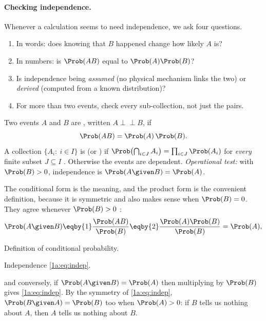 \paragraph{Checking independence.}
Whenever a calculation seems to need independence, we ask four questions.
\begin{enumerate}[leftmargin=1.5em,itemsep=1pt]
  \item In words: does knowing that $B$ happened change how likely $A$ is?
  \item In numbers: is $\Prob(AB)$ equal to $\Prob(A)\Prob(B)$?
  \item Is independence being \emph{assumed} (no physical mechanism links the
        two) or \emph{derived} (computed from a known distribution)?
  \item For more than two events, check every sub-collection, not just the pairs.
\end{enumerate}

\begin{workdef}[independence]
Two events $A$ and $B$ are , written $A\perp\!\!\!\perp B$, if
\begin{equation}
\Prob(AB)=\Prob(A)\,\Prob(B).
\label{1a:eq:indep}
\end{equation}
A collection $\{A_i:\ i\in I\}$ is  (or ) if
$\Prob\bigl(\bigcap_{i\in J}A_i\bigr)=\prod_{i\in J}\Prob(A_i)$ for \emph{every} finite
subset $J\subseteq I$ . Otherwise the events are dependent.
\emph{Operational test:} with $\Prob(B)>0$, independence is $\Prob(A\given B)=\Prob(A)$.
\end{workdef}

The conditional form is the meaning, and the product form is the convenient
definition, because it is symmetric and also makes sense when $\Prob(B)=0$. They
agree whenever $\Prob(B)>0$ :
\begin{align*}
\Prob(A\given B)\eqby{1}\frac{\Prob(AB)}{\Prob(B)}\eqby{2}\frac{\Prob(A)\Prob(B)}{\Prob(B)}=\Prob(A),
\end{align*}
\begin{explain}
  \item Definition of conditional probability.
  \item Independence \eqref{1a:eq:indep}.
\end{explain}
and conversely, if $\Prob(A\given B)=\Prob(A)$ then multiplying by $\Prob(B)$ gives
\eqref{1a:eq:indep}. By the symmetry of \eqref{1a:eq:indep}, $\Prob(B\given A)=\Prob(B)$ too
when $\Prob(A)>0$: if $B$ tells us nothing about $A$, then $A$ tells us nothing about
$B$.

